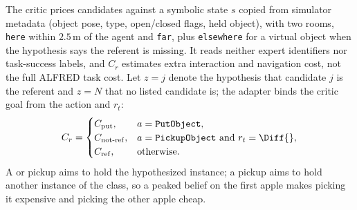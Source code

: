 \documentclass[conference]{IEEEtran}
\begin{document}
The critic prices candidates against a symbolic state $s$ copied from simulator metadata (object pose, type, open/closed flags, held object), with two rooms, \texttt{here} within $2.5$\,m of the agent and \texttt{far}, plus \texttt{elsewhere} for a virtual object when the hypothesis says the referent is missing.
It reads neither expert identifiers nor task-success labels, and $C_r$ estimates extra interaction and navigation cost, not the full ALFRED task cost.
Let $z{=}j$ denote the hypothesis that candidate $j$ is the referent and $z{=}N$ that no listed candidate is; the adapter binds the critic goal from the action and $r_t$:
\begin{equation}
C_r=
\begin{cases}
C_{\mathrm{put}}, & a=\texttt{PutObject},\\
C_{\mathrm{not\text{-}ref}}, & a=\texttt{PickupObject}\ \text{and}\ r_t=\Diff{},\\
C_{\mathrm{ref}}, & \text{otherwise.}
\end{cases}
\label{eq:Cr}
\end{equation}
A \Same{} or \Ground{} pickup aims to hold the hypothesized instance; a \Diff{} pickup aims to hold another instance of the class, so a peaked belief on the first apple makes picking it expensive and picking the other apple cheap.
\end{document}

